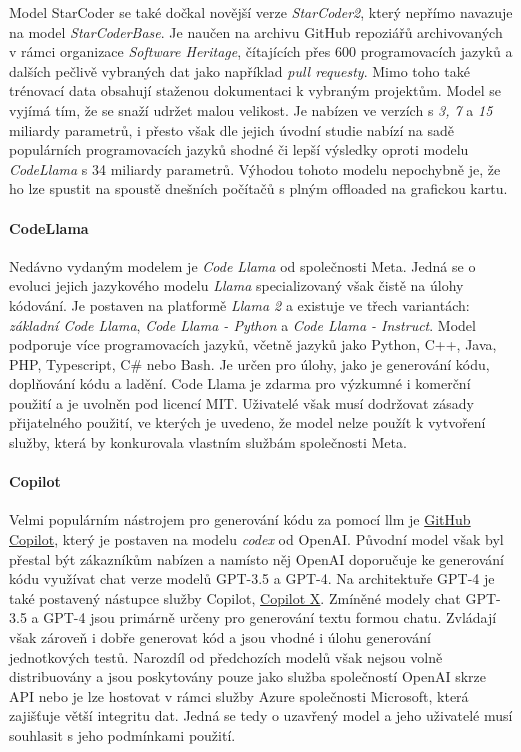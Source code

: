 \documentclass[czech, ma, kiv, he, iso690alph, pdf, viewonly]{fasthesis}
\begin{document}
    Model StarCoder se také dočkal novější verze \textit{StarCoder2}, který nepřímo navazuje na model \textit{StarCoderBase}. Je naučen na archivu GitHub repoziářů archivovaných v rámci organizace \textit{Software Heritage}, čítajících přes 600 programovacích jazyků a dalších pečlivě vybraných dat jako například \textit{pull requesty}. Mimo toho také trénovací data obsahují staženou dokumentaci k vybraným projektům. Model se vyjímá tím, že se snaží udržet malou velikost. Je nabízen ve verzích s \textit{3, 7} a \textit{15} miliardy parametrů, i přesto však dle jejich úvodní studie \cite{lozhkov2024starcoder} nabízí na sadě populárních programovacích jazyků shodné či lepší výsledky oproti modelu \textit{CodeLlama} s 34 miliardy parametrů. Výhodou tohoto modelu nepochybně je, že ho lze spustit na spoustě dnešních počítačů s plným offloaded na grafickou kartu.

    \paragraph{CodeLlama} Nedávno vydaným modelem je \textit{Code Llama} od společnosti Meta. Jedná se o evoluci jejich jazykového modelu \textit{Llama} specializovaný však čistě na úlohy kódování. Je postaven na platformě \textit{Llama 2} a existuje ve třech variantách: \textit{základní Code Llama}, \textit{Code Llama - Python} a \textit{Code Llama - Instruct}. Model podporuje více programovacích jazyků, včetně jazyků jako Python, C++, Java, PHP, Typescript, C# nebo Bash. Je určen pro úlohy, jako je generování kódu, doplňování kódu a ladění. Code Llama je zdarma pro výzkumné i komerční použití a je uvolněn pod licencí MIT. Uživatelé však musí dodržovat  zásady přijatelného použití, ve kterých je uvedeno, že model nelze použít k vytvoření služby, která by konkurovala vlastním službám společnosti Meta. 

    \paragraph{Copilot} Velmi populárním nástrojem pro generování kódu za pomocí \gls{llm} je \href{https://github.com/features/copilot}{GitHub Copilot}, který je postaven na modelu \textit{codex} od OpenAI. Původní model však byl přestal být zákazníkům nabízen a namísto něj OpenAI doporučuje ke generování kódu využívat chat verze modelů GPT-3.5 a GPT-4. Na architektuře GPT-4 je také postavený nástupce služby Copilot, \href{https://github.com/features/preview/copilot-x}{Copilot X}. Zmíněné modely chat GPT-3.5 a GPT-4 jsou primárně určeny pro generování textu formou chatu. Zvládají však zároveň i dobře generovat kód a jsou vhodné i úlohu generování jednotkových testů. Narozdíl od předchozích modelů však nejsou volně distribuovány a jsou poskytovány pouze jako služba společností OpenAI skrze API nebo je lze hostovat v rámci služby Azure společnosti Microsoft, která zajišťuje větší integritu dat. Jedná se tedy o uzavřený model a jeho uživatelé musí souhlasit s jeho podmínkami použití.
\end{document}
